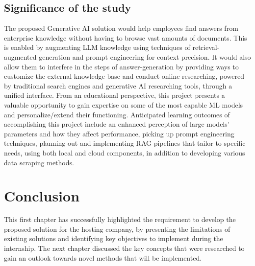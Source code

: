 \subsection{Significance of the study}
The proposed Generative AI solution would help employees find answers from enterprise knowledge without having to browse vast amounts of documents. This is enabled by augmenting LLM knowledge using techniques of retrieval-augmented generation and prompt engineering for context precision. It would also allow them to interfere in the steps of answer-generation by providing ways to customize the external knowledge base and conduct online researching, powered by traditional search engines and generative AI researching tools, through a unified interface.\medskip\newline
From an educational perspective, this project presents a valuable opportunity to gain expertise on some of the most capable ML models and personalize/extend their functioning. Anticipated learning outcomes of accomplishing this project include an enhanced perception of large models' parameters and how they affect performance, picking up prompt engineering techniques, planning out and implementing RAG pipelines that tailor to specific needs, using both local and cloud components, in addition to developing various data scraping methods.
\section{Conclusion}
This first chapter has successfully highlighted the requirement to develop the proposed solution for the hosting company, by presenting the limitations of existing solutions and identifying key objectives to implement during the internship.\newline
The next chapter discussed the key concepts that were researched to gain an outlook towards novel methods that will be implemented.
